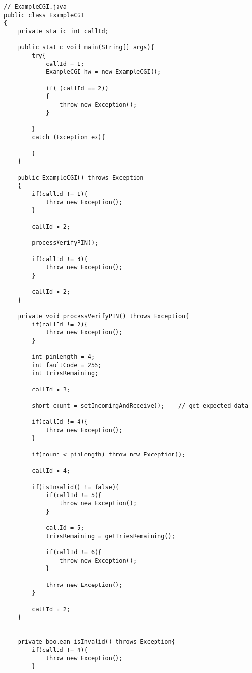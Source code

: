 \begin{lstlisting}[caption={Mocked Java example code from the Java Card samples with the call graph integrity countermeasure implemented},label={lst:exampleCGI}]
// ExampleCGI.java
public class ExampleCGI
{
    private static int callId;

    public static void main(String[] args){
        try{
            callId = 1;
            ExampleCGI hw = new ExampleCGI();

            if(!(callId == 2))
            {
                throw new Exception();
            }

        }
        catch (Exception ex){

        }
    }

    public ExampleCGI() throws Exception
    {
        if(callId != 1){
            throw new Exception();
        }

        callId = 2;

        processVerifyPIN();

        if(callId != 3){
            throw new Exception();
        }

        callId = 2;
    }

    private void processVerifyPIN() throws Exception{
        if(callId != 2){
            throw new Exception();
        }

        int pinLength = 4;
        int faultCode = 255;
        int triesRemaining;

        callId = 3;

        short count = setIncomingAndReceive();    // get expected data

        if(callId != 4){
            throw new Exception();
        }

        if(count < pinLength) throw new Exception();

        callId = 4;

        if(isInvalid() != false){
            if(callId != 5){
                throw new Exception();
            }

            callId = 5;
            triesRemaining = getTriesRemaining();
            
            if(callId != 6){
                throw new Exception();
            }

            throw new Exception();
        }

        callId = 2;
    }


    private boolean isInvalid() throws Exception{
        if(callId != 4){
            throw new Exception();
        }


\end{lstlisting}
